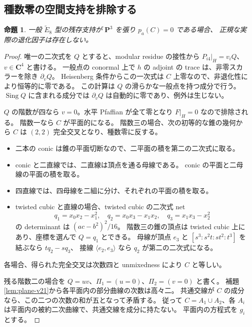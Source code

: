 \documentclass[11pt,a4paper]{ltjsarticle}
\newcommand{\CC}{\mathbf C}\newcommand{\QQ}{\mathbf Q}
\newcommand{\PP}{\mathbf P}\renewcommand{\AA}{\mathbf A}
\newtheorem{proposition}[theorem]{命題}
\theoremstyle{remark}\newtheorem{remark}[theorem]{注意}
\begin{document}
\subsection{種数零の空間支持を排除する}

\begin{proposition}\label{prop:genus-zero}
一般 $\widetilde E_8$ 型の残存支持が $\PP^3$ を張り $p_a(C)=0$ である場合、
正規な実際の退化因子は存在しない。
\end{proposition}
\begin{proof}
唯一の二次式を $Q$ とすると、modular residue の接性から
$P_{i4}|_H=v_iQ$、$v\in\CC^4$ と書ける。
一般点の conormal 上で $h$ の adjoint の trace は、非零スカラーを除き $\partial_vQ$。
Heisenberg 条件からこの一次式は $C$ 上零なので、非退化性により恒等的に零である。
この計算は $Q$ の滑らかな一般点を持つ成分で行う。
$\operatorname{Sing}Q$ に含まれる成分では $\partial_vQ$ は自動的に零であり、例外は生じない。

$Q$ の階数が四なら $v=0$。水平 Pfaffian が全て零となり $F|_H=0$ なので排除される。
階数一なら $C$ が平面的になる。
階数三の場合、次の初等的な錐の幾何から $C$ は $(2,2)$ 完全交叉となり、種数零に反する。
\begin{itemize}
\item 二本の conic は錐の平面切断なので、二平面の積を第二の二次式に取る。
\item conic と二直線では、二直線は頂点を通る母線である。
conic の平面と二母線の平面の積を取る。
\item 四直線では、四母線を二組に分け、それぞれの平面の積を取る。
\item twisted cubic と直線の場合、twisted cubic の二次式 net
\[
q_1=x_0x_2-x_1^2,\quad q_2=x_0x_3-x_1x_2,\quad q_3=x_1x_3-x_2^2
\]
の determinant は $(ac-b^2)^2/16$。
階数三の錐の頂点は twisted cubic 上にあり、座標を選んで $Q=q_1$ とできる。
母線が頂点 $e_3$ と $[s^3:s^2t:st^2:t^3]$ を結ぶなら $tq_2-sq_3$、
接線 $\langle e_2,e_3\rangle$ なら $q_2$ が第二の二次式になる。
\end{itemize}
各場合、得られた完全交叉は次数四と unmixedness により $C$ と等しい。

残る階数二の場合を $Q=uv$、$\Pi_1=(u=0)$、$\Pi_2=(v=0)$ と書く。
補題\ref{lem:plane-v21}から各平面内の部分曲線の次数は高々二。
共通交線が $C$ の成分なら、この二つの次数の和が五となって矛盾する。
従って $C=A_1\cup A_2$、各 $A_i$ は平面内の被約二次曲線で、共通交線を成分に持たない。
平面内の方程式を $g_i$ とする。


\end{proof}
\end{document}
